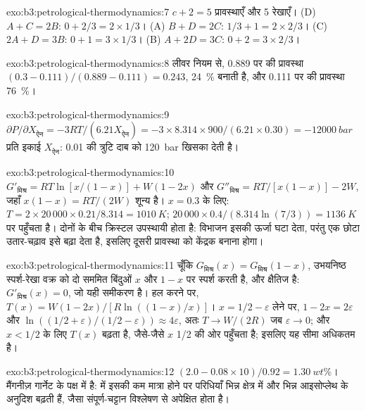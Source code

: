 \begin{solution}{exo:b3:petrological-thermodynamics:7}
$c + 2 = 5$ प्रावस्थाएँ और 5 रेखाएँ। (D) $A + C = 2B$: $0 + 2/3 = 2\times1/3$। (A)
$B + D = 2C$: $1/3 + 1 = 2\times2/3$। (C) $2A + D = 3B$: $0 + 1 = 3\times1/3$।
(B) $A + 2D = 3C$: $0 + 2 = 3\times2/3$।
\end{solution}

\begin{solution}{exo:b3:petrological-thermodynamics:8}
लीवर नियम से, 0.889 पर की प्रावस्था $(0.3 - 0.111)/(0.889 - 0.111) =
0.243$, \qty{24}{\percent} बनाती है, और 0.111 पर की प्रावस्था \qty{76}{\percent}।
\end{solution}

\begin{solution}{exo:b3:petrological-thermodynamics:9}
$\partial P/\partial X_{\text{ऐन}} = -3RT/(6.21X_{\text{ऐन}}) =
-3\times8.314\times900/(6.21\times0.30) = \qty{-12000}{bar}$ प्रति इकाई
$X_{\text{ऐन}}$: 0.01 की त्रुटि दाब को \qty{120}{bar} खिसका देती है।
\end{solution}

\begin{solution}{exo:b3:petrological-thermodynamics:10}
$G'_{\text{मिश्र}} = RT\ln[x/(1 - x)] + W(1 - 2x)$ और $G''_{\text{मिश्र}} =
RT/[x(1 - x)] - 2W$, जहाँ $x(1 - x) = RT/(2W)$ शून्य है। $x = 0.3$ के लिए: $T =
2\times20\,000\times0.21/8.314 = \qty{1010}{K}$; 
$20\,000\times0.4/(8.314\ln(7/3)) = \qty{1136}{K}$ पर पहुँचता है। दोनों के बीच क्रिस्टल
उपस्थायी होता है: विभाजन इसकी ऊर्जा घटा देता, परंतु एक छोटा
उतार-चढ़ाव इसे बढ़ा देता है, इसलिए दूसरी प्रावस्था को केंद्रक बनाना होगा।
\end{solution}

\begin{solution}{exo:b3:petrological-thermodynamics:11}
चूँकि $G_{\text{मिश्र}}(x) = G_{\text{मिश्र}}(1 - x)$, उभयनिष्ठ स्पर्श-रेखा
वक्र को दो सममित बिंदुओं $x$ और $1 - x$ पर स्पर्श करती है, और क्षैतिज है:
$G'_{\text{मिश्र}}(x) = 0$, जो यही समीकरण है। हल करने पर, $T(x) = W(1 -
2x)/[R\ln((1 - x)/x)]$। $x = 1/2 - \varepsilon$ लेने पर, $1 - 2x = 2\varepsilon$
और $\ln((1/2 + \varepsilon)/(1/2 - \varepsilon)) \approx 4\varepsilon$, अतः
$T \to W/(2R)$ जब $\varepsilon \to 0$; और $x < 1/2$ के लिए $T(x)$ बढ़ता है, जैसे-जैसे $x$
1/2 की ओर पहुँचता है; इसलिए यह सीमा अधिकतम है।
\end{solution}

\begin{solution}{exo:b3:petrological-thermodynamics:12}
$(2.0 - 0.08\times10)/0.92 = \qty{1.30}{wt\percent}$। मैंगनीज़ गार्नेट के पक्ष में है:
 में इसकी कम मात्रा होने पर परिधियाँ भिन्न क्षेत्र में
और भिन्न आइसोप्लेथ के अनुदिश बढ़ती हैं, जैसा संपूर्ण-चट्टान विश्लेषण से
अपेक्षित होता है।
\end{solution}

